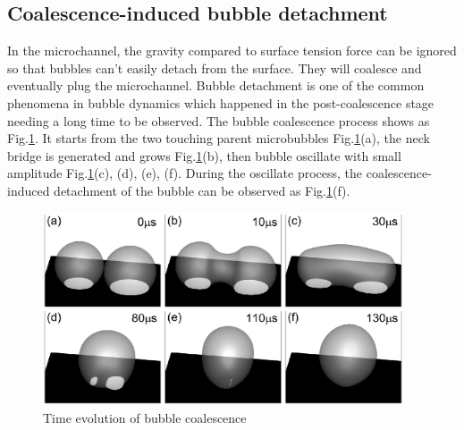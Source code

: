 \documentclass[10pt]{elsarticle}
\begin{document}
\subsection{Coalescence-induced bubble detachment}
In the microchannel, the gravity compared to surface tension force can be ignored so that bubbles can't easily detach from the surface. They will coalesce and eventually plug the microchannel. Bubble detachment is one of the common phenomena in bubble dynamics which happened in the post-coalescence stage needing a long time to be observed.  The bubble coalescence process shows as Fig.\ref{fig:detach}. It starts from the two touching parent microbubbles  Fig.\ref{fig:detach}(a), the neck bridge is generated and grows Fig.\ref{fig:detach}(b), then bubble oscillate with small amplitude Fig.\ref{fig:detach}(c), (d), (e), (f). 
During the oscillate process, the coalescence-induced detachment of the bubble can be observed as Fig.\ref{fig:detach}(f).   
\begin{figure}[!htpb]
  \centering
  \includegraphics[width=0.95\textwidth]{Process.eps}
  \caption{Time evolution of bubble coalescence}
 \label{fig:detach}
\end{figure}
\end{document}
